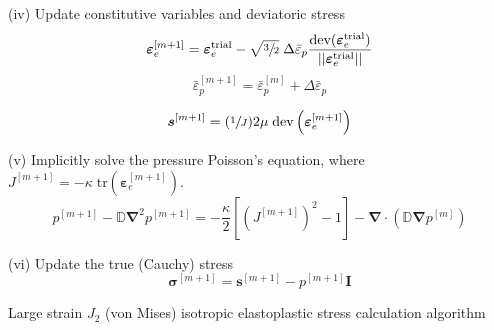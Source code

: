 \documentclass[sn-mathphys,Numbered,draft]{sn-jnl}%
\newcommand{\bb}{\boldsymbol}
\begin{document}
\begin{algorithm}[htb]
(iv) Update constitutive variables and deviatoric stress
\begin{equation}
	\boldsymbol{\varepsilon}_{e}^{[m+1]}
	=
	\boldsymbol{\varepsilon}_{e}^{\text{trial}}
	- \sqrt{\sfrac{3}{2}} \; \Delta\bar{\varepsilon}_p
	\frac{\text{dev}(\boldsymbol{\varepsilon}_{e}^{\text{trial}})}{||\boldsymbol{\varepsilon}_{e}^{\text{trial}}||}
	\nonumber
\end{equation}
\begin{equation}
	\bar{\varepsilon}_p^{[m+1]} = \bar{\varepsilon}_p^{[m]} + \Delta\bar{\varepsilon}_p \nonumber
\end{equation}

\begin{equation}
	\boldsymbol{s}^{[m+1]}
	=
	(\sfrac{1}{J}) 2\mu \;\text{dev}\left(\boldsymbol{\varepsilon}_{e}^{[m+1]}\right) \nonumber
\end{equation}

(v) Implicitly solve the pressure Poisson's equation, where $J^{[m+1]} = -\kappa \; \text{tr}\left(\boldsymbol{\varepsilon}_{e}^{[m+1]}\right)$.
\begin{equation}
	p^{[m+1]} - \mathbb{D} \bb{\nabla}^2 p^{[m+1]} = -\frac{\kappa}{2} \left[\left(J^{[m+1]}\right)^{2} - 1\right] - \bb{\nabla} \cdot \left( \mathbb{D} \bb{\nabla} p^{[m]} \right)
\end{equation}


(vi) Update the true (Cauchy) stress
\begin{equation}
	\boldsymbol{\sigma}^{[m+1]} = \boldsymbol{s}^{[m+1]} -  p^{[m+1]}\textbf{I} \nonumber
\end{equation}

\caption{Large strain $J_2$ (von Mises) isotropic elastoplastic stress calculation algorithm \citep{de_souza_neto_computational_2008} }
\end{algorithm}






\end{document}

